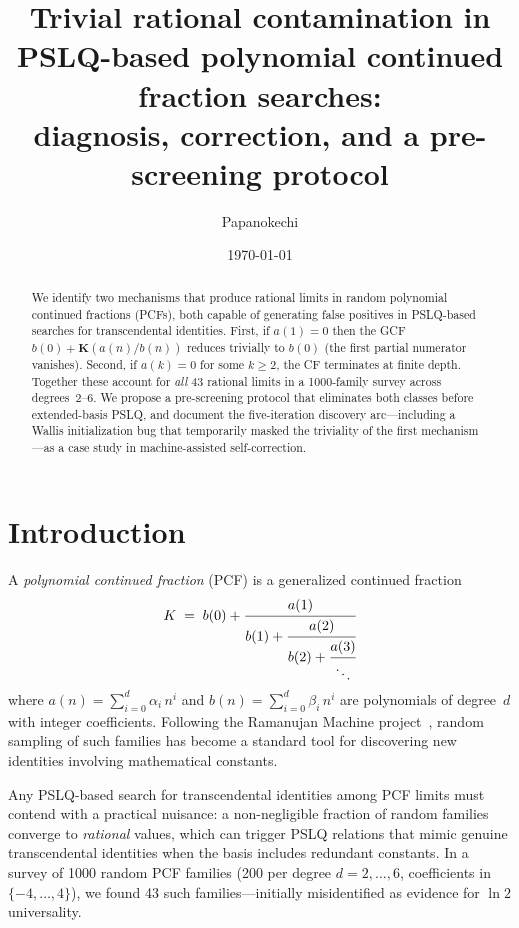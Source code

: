 \documentclass[11pt]{amsart}
\title[Rational Contamination in PCF Searches]{Trivial rational contamination in PSLQ-based
  polynomial continued fraction searches:\\
  diagnosis, correction, and a pre-screening protocol}
\author{Papanokechi}
\date{\today}
\theoremstyle{definition}
\theoremstyle{remark}
\begin{document}
\begin{abstract}
We identify two mechanisms that produce rational limits in random
polynomial continued fractions (PCFs), both capable of generating
false positives in PSLQ-based searches for transcendental identities.
First, if $a(1)=0$ then the GCF $b(0)+\mathbf{K}(a(n)/b(n))$
reduces trivially to $b(0)$ (the first partial numerator vanishes).
Second, if $a(k)=0$ for some $k\ge 2$, the CF terminates at finite
depth.
Together these account for \emph{all} 43 rational limits in a
1000-family survey across degrees~2--6.
We propose a pre-screening protocol that eliminates both classes
before extended-basis PSLQ, and document the five-iteration
discovery arc---including a Wallis initialization bug that temporarily
masked the triviality of the first mechanism---as a case study
in machine-assisted self-correction.
\end{abstract}

\maketitle

\section{Introduction}\label{sec:intro}

A \emph{polynomial continued fraction} (PCF) is a generalized continued
fraction
\begin{equation}\label{eq:pcf}
  K \;=\; b(0) + \cfrac{a(1)}{b(1) + \cfrac{a(2)}{b(2) + \cfrac{a(3)}{\ddots}}}
\end{equation}
where $a(n) = \sum_{i=0}^{d} \alpha_i\, n^i$ and
$b(n) = \sum_{i=0}^{d} \beta_i\, n^i$
are polynomials of degree~$d$ with integer coefficients.
Following the Ramanujan Machine project~\cite{raayoni2021}, random sampling of
such families has become a standard tool for discovering new identities
involving mathematical constants.

Any PSLQ-based search for transcendental identities among PCF limits
must contend with a practical nuisance: a non-negligible fraction of
random families converge to \emph{rational} values, which can trigger
PSLQ relations that mimic genuine transcendental identities when the
basis includes redundant constants.
In a survey of 1000 random PCF families (200 per degree $d=2,\ldots,6$,
coefficients in $\{-4,\ldots,4\}$), we found 43 such families---initially
misidentified as evidence for $\ln 2$ universality.
\end{document}
